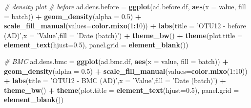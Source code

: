 \documentclass[]{book}
\newenvironment{Shaded}{\begin{snugshade}}{\end{snugshade}}
\newcommand{\KeywordTok}[1]{\textcolor[rgb]{0.13,0.29,0.53}{\textbf{#1}}}
\newcommand{\DataTypeTok}[1]{\textcolor[rgb]{0.13,0.29,0.53}{#1}}
\newcommand{\DecValTok}[1]{\textcolor[rgb]{0.00,0.00,0.81}{#1}}
\newcommand{\FloatTok}[1]{\textcolor[rgb]{0.00,0.00,0.81}{#1}}
\newcommand{\StringTok}[1]{\textcolor[rgb]{0.31,0.60,0.02}{#1}}
\newcommand{\CommentTok}[1]{\textcolor[rgb]{0.56,0.35,0.01}{\textit{#1}}}
\newcommand{\OperatorTok}[1]{\textcolor[rgb]{0.81,0.36,0.00}{\textbf{#1}}}
\newcommand{\NormalTok}[1]{#1}
\begin{document}
\begin{Shaded}
\begin{Highlighting}[]
\CommentTok{# density plot}
\CommentTok{# before}
\NormalTok{ad.dens.before =}\StringTok{ }\KeywordTok{ggplot}\NormalTok{(ad.before.df, }\KeywordTok{aes}\NormalTok{(}\DataTypeTok{x =}\NormalTok{ value, }\DataTypeTok{fill =}\NormalTok{ batch)) }\OperatorTok{+}\StringTok{ }\KeywordTok{geom_density}\NormalTok{(}\DataTypeTok{alpha =} \FloatTok{0.5}\NormalTok{) }\OperatorTok{+}\StringTok{ }\KeywordTok{scale_fill_manual}\NormalTok{(}\DataTypeTok{values=}\KeywordTok{color.mixo}\NormalTok{(}\DecValTok{1}\OperatorTok{:}\DecValTok{10}\NormalTok{)) }\OperatorTok{+}\StringTok{ }\KeywordTok{labs}\NormalTok{(}\DataTypeTok{title =} \StringTok{'OTU12 - before (AD)'}\NormalTok{,}\DataTypeTok{x =} \StringTok{'Value'}\NormalTok{,}\DataTypeTok{fill =} \StringTok{'Date (batch)'}\NormalTok{) }\OperatorTok{+}\StringTok{ }\KeywordTok{theme_bw}\NormalTok{() }\OperatorTok{+}\StringTok{ }\KeywordTok{theme}\NormalTok{(}\DataTypeTok{plot.title =} \KeywordTok{element_text}\NormalTok{(}\DataTypeTok{hjust=}\FloatTok{0.5}\NormalTok{), }\DataTypeTok{panel.grid =} \KeywordTok{element_blank}\NormalTok{())}

\CommentTok{# BMC}
\NormalTok{ad.dens.bmc =}\StringTok{ }\KeywordTok{ggplot}\NormalTok{(ad.bmc.df, }\KeywordTok{aes}\NormalTok{(}\DataTypeTok{x =}\NormalTok{ value, }\DataTypeTok{fill =}\NormalTok{ batch)) }\OperatorTok{+}\StringTok{ }\KeywordTok{geom_density}\NormalTok{(}\DataTypeTok{alpha =} \FloatTok{0.5}\NormalTok{) }\OperatorTok{+}\StringTok{ }\KeywordTok{scale_fill_manual}\NormalTok{(}\DataTypeTok{values=}\KeywordTok{color.mixo}\NormalTok{(}\DecValTok{1}\OperatorTok{:}\DecValTok{10}\NormalTok{)) }\OperatorTok{+}\StringTok{ }\KeywordTok{labs}\NormalTok{(}\DataTypeTok{title =} \StringTok{'OTU12 - BMC (AD)'}\NormalTok{,}\DataTypeTok{x =} \StringTok{'Value'}\NormalTok{,}\DataTypeTok{fill =} \StringTok{'Date (batch)'}\NormalTok{) }\OperatorTok{+}\StringTok{ }\KeywordTok{theme_bw}\NormalTok{() }\OperatorTok{+}\StringTok{ }\KeywordTok{theme}\NormalTok{(}\DataTypeTok{plot.title =} \KeywordTok{element_text}\NormalTok{(}\DataTypeTok{hjust=}\FloatTok{0.5}\NormalTok{), }\DataTypeTok{panel.grid =} \KeywordTok{element_blank}\NormalTok{())}



\end{Highlighting}
\end{Shaded}
\end{document}

